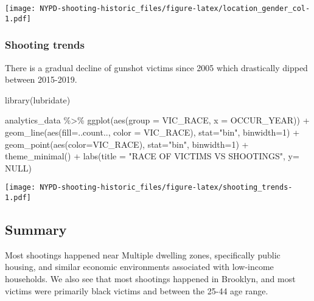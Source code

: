 \documentclass[
]{article}
\newenvironment{Shaded}{\begin{snugshade}}{\end{snugshade}}
\newcommand{\AttributeTok}[1]{\textcolor[rgb]{0.77,0.63,0.00}{#1}}
\newcommand{\ConstantTok}[1]{\textcolor[rgb]{0.00,0.00,0.00}{#1}}
\newcommand{\DecValTok}[1]{\textcolor[rgb]{0.00,0.00,0.81}{#1}}
\newcommand{\FunctionTok}[1]{\textcolor[rgb]{0.00,0.00,0.00}{#1}}
\newcommand{\NormalTok}[1]{#1}
\newcommand{\SpecialCharTok}[1]{\textcolor[rgb]{0.00,0.00,0.00}{#1}}
\newcommand{\StringTok}[1]{\textcolor[rgb]{0.31,0.60,0.02}{#1}}
\begin{document}
\texttt{[image: NYPD-shooting-historic\_files/figure-latex/location\_gender\_col-1.pdf]}

\hypertarget{shooting-trends}{%
\subsubsection{Shooting trends}\label{shooting-trends}}

There is a gradual decline of gunshot victims since 2005 which
drastically dipped between 2015-2019.

\begin{Shaded}
\begin{Highlighting}[]
\FunctionTok{library}\NormalTok{(lubridate)}

\NormalTok{analytics\_data }\SpecialCharTok{\%\textgreater{}\%} \FunctionTok{ggplot}\NormalTok{(}\FunctionTok{aes}\NormalTok{(}\AttributeTok{group =}\NormalTok{ VIC\_RACE, }\AttributeTok{x =}\NormalTok{ OCCUR\_YEAR)) }\SpecialCharTok{+} \FunctionTok{geom\_line}\NormalTok{(}\FunctionTok{aes}\NormalTok{(}\AttributeTok{fill=}\NormalTok{..count.., }\AttributeTok{color =}\NormalTok{ VIC\_RACE), }\AttributeTok{stat=}\StringTok{"bin"}\NormalTok{, }\AttributeTok{binwidth=}\DecValTok{1}\NormalTok{) }\SpecialCharTok{+}
        \FunctionTok{geom\_point}\NormalTok{(}\FunctionTok{aes}\NormalTok{(}\AttributeTok{color=}\NormalTok{VIC\_RACE), }\AttributeTok{stat=}\StringTok{"bin"}\NormalTok{, }\AttributeTok{binwidth=}\DecValTok{1}\NormalTok{) }\SpecialCharTok{+} \FunctionTok{theme\_minimal}\NormalTok{() }\SpecialCharTok{+} \FunctionTok{labs}\NormalTok{(}\AttributeTok{title =} \StringTok{"RACE OF VICTIMS VS SHOOTINGS"}\NormalTok{, }\AttributeTok{y=} \ConstantTok{NULL}\NormalTok{)}
\end{Highlighting}
\end{Shaded}

\texttt{[image: NYPD-shooting-historic\_files/figure-latex/shooting\_trends-1.pdf]}

\hypertarget{summary}{%
\subsection{Summary}\label{summary}}

Most shootings happened near Multiple dwelling zones, specifically
public housing, and similar economic environments associated with
low-income households. We also see that most shootings happened in
Brooklyn, and most victims were primarily black victims and between the
25-44 age range.
\end{document}
